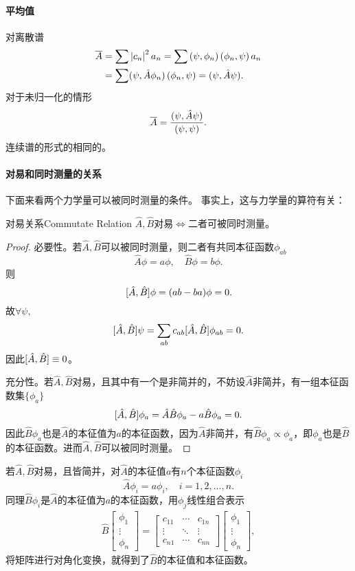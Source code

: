 \paragraph{平均值}对离散谱
\begin{align}\notag
	\overline{A} & =\sum\left\lvert c_n\right\rvert^2a_n=\sum\left(\psi,\phi_n\right)\left(\phi_n,\psi\right)a_n  \\
	       & =\sum(\psi,\hat A \phi_n)\left(\phi_n,\psi\right)=(\psi,\hat A\psi).\label{Derivation of Mean Value}
\end{align}
对于未归一化的情形
\[
	\overline{A}=\frac{(\psi,\hat A\psi)}{(\psi,\psi)}.
\]
连续谱的形式的相同的。

\paragraph{对易和同时测量的关系}下面来看两个力学量可以被同时测量的条件。
事实上，这与力学量的算符有关：
\begin{theorem}{对易关系}{Commutate Relation}
	\centering $\hat A,\hat B$对易$\iff$二者可被同时测量。
\end{theorem}
\begin{proof}
	必要性。若$\hat A,\hat B$可以被同时测量，则二者有共同本征函数$\phi_{ab}$
	\[
		\hat A\phi=a\phi,\quad \hat B\phi=b\phi.
	\]
	则
	\[
		[\hat A,\hat B]\phi=(ab-ba)\phi=0.
	\]
	故$\forall\psi,$
	\[
		[\hat A,\hat B]\psi=\sum_{ab}c_{ab}[\hat A,\hat B]\phi_{ab}=0.
	\]
	因此$[\hat A,\hat B]\equiv 0$。
	
	充分性。若$\hat A,\hat B$对易，且其中有一个是非简并的，不妨设$\hat A$非简并，有一组本征函数集$\{\phi_a\}$
	\[
		[\hat A,\hat B]\phi_a=\hat A\hat B\phi_a-a\hat B\phi_a=0.
	\]
	因此$\hat B\phi_a$也是$\hat A$的本征值为$a$的本征函数，因为$\hat A$非简并，有$\hat B\phi_a\propto\phi_a$，即$\phi_a$也是$\hat B$的本征函数。进而$\hat A,\hat B$可以被同时测量。
\end{proof}

若$\hat A,\hat B$对易，且皆简并，对$\hat A$的本征值$a$有$n$个本征函数$\phi_i$
\[
	\hat A\phi_i=a\phi_i,\quad i=1,2,\ldots,n.
\]
同理$\hat B\phi_i$是$\hat A$的本征值为$a$的本征函数，用$\phi_j$线性组合表示
\begin{align*}
	\hat B\begin{bmatrix}
		\phi_1 \\\vdots\\\phi_n
	\end{bmatrix}=\begin{bmatrix}
		c_{11} & \cdots & c_{1n} \\
		\vdots & \ddots & \vdots \\
		c_{n1} & \cdots & c_{nn}
	\end{bmatrix}\begin{bmatrix}
		\phi_1 \\\vdots\\\phi_n
	\end{bmatrix},
\end{align*}
将矩阵进行对角化变换，就得到了$\hat B$的本征值和本征函数。
